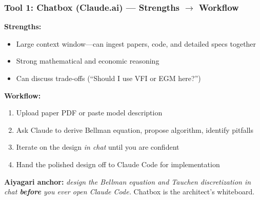 \documentclass[10pt,english,aspectratio=169]{beamer}
\begin{document}
\begin{frame}
\frametitle{Tool 1: Chatbox (Claude.ai) --- Strengths $\to$ Workflow}

\textbf{Strengths:}
\begin{itemize}
    \item Large context window---can ingest papers, code, and detailed specs together
    \item Strong mathematical and economic reasoning
    \item Can discuss trade-offs (``Should I use VFI or EGM here?'')
\end{itemize}

\vspace{0.2cm}

\textbf{Workflow:}
\begin{enumerate}
    \item Upload paper PDF or paste model description
    \item Ask Claude to derive Bellman equation, propose algorithm, identify pitfalls
    \item Iterate on the design \textit{in chat} until you are confident
    \item Hand the polished design off to Claude Code for implementation
\end{enumerate}

\vspace{0.2cm}

\textbf{Aiyagari anchor:} \textit{design the Bellman equation and Tauchen discretization in chat \textbf{before} you ever open Claude Code.} Chatbox is the architect's whiteboard.
\end{frame}
\end{document}
